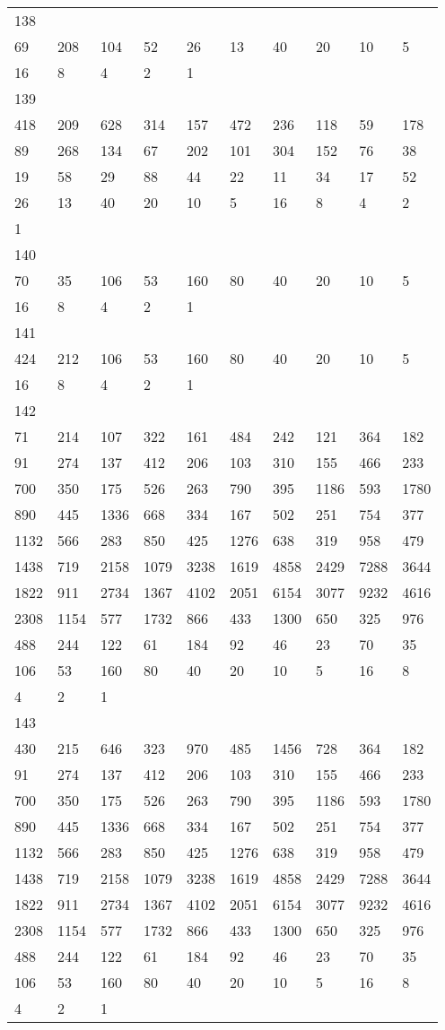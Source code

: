 \begin{longtable}{*{10}{l}}
138&&&&&&&&&\\
69& 208& 104& 52& 26& 13& 40& 20& 10& 5\\
16& 8& 4& 2& 1& \\

139&&&&&&&&&\\
418& 209& 628& 314& 157& 472& 236& 118& 59& 178\\
89& 268& 134& 67& 202& 101& 304& 152& 76& 38\\
19& 58& 29& 88& 44& 22& 11& 34& 17& 52\\
26& 13& 40& 20& 10& 5& 16& 8& 4& 2\\
1& \\

140&&&&&&&&&\\
70& 35& 106& 53& 160& 80& 40& 20& 10& 5\\
16& 8& 4& 2& 1& \\

141&&&&&&&&&\\
424& 212& 106& 53& 160& 80& 40& 20& 10& 5\\
16& 8& 4& 2& 1& \\

142&&&&&&&&&\\
71& 214& 107& 322& 161& 484& 242& 121& 364& 182\\
91& 274& 137& 412& 206& 103& 310& 155& 466& 233\\
700& 350& 175& 526& 263& 790& 395& 1186& 593& 1780\\
890& 445& 1336& 668& 334& 167& 502& 251& 754& 377\\
1132& 566& 283& 850& 425& 1276& 638& 319& 958& 479\\
1438& 719& 2158& 1079& 3238& 1619& 4858& 2429& 7288& 3644\\
1822& 911& 2734& 1367& 4102& 2051& 6154& 3077& 9232& 4616\\
2308& 1154& 577& 1732& 866& 433& 1300& 650& 325& 976\\
488& 244& 122& 61& 184& 92& 46& 23& 70& 35\\
106& 53& 160& 80& 40& 20& 10& 5& 16& 8\\
4& 2& 1& \\

143&&&&&&&&&\\
430& 215& 646& 323& 970& 485& 1456& 728& 364& 182\\
91& 274& 137& 412& 206& 103& 310& 155& 466& 233\\
700& 350& 175& 526& 263& 790& 395& 1186& 593& 1780\\
890& 445& 1336& 668& 334& 167& 502& 251& 754& 377\\
1132& 566& 283& 850& 425& 1276& 638& 319& 958& 479\\
1438& 719& 2158& 1079& 3238& 1619& 4858& 2429& 7288& 3644\\
1822& 911& 2734& 1367& 4102& 2051& 6154& 3077& 9232& 4616\\
2308& 1154& 577& 1732& 866& 433& 1300& 650& 325& 976\\
488& 244& 122& 61& 184& 92& 46& 23& 70& 35\\
106& 53& 160& 80& 40& 20& 10& 5& 16& 8\\
4& 2& 1& \\


\end{longtable}
